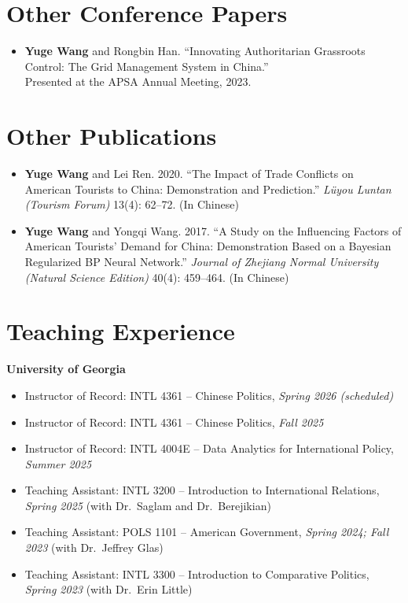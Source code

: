 \documentclass[11pt]{article}
\begin{document}
	\section*{Other Conference Papers}
	\begin{itemize}
		\item \textbf{Yuge Wang} and Rongbin Han. ``Innovating Authoritarian Grassroots Control: The Grid Management System in China.''\\
		Presented at the APSA Annual Meeting, 2023.
	\end{itemize}
	
	\section*{Other Publications}
	\begin{itemize}
		\item \textbf{Yuge Wang} and Lei Ren. 2020. ``The Impact of Trade Conflicts on American Tourists to China: Demonstration and Prediction.'' \emph{Lüyou Luntan (Tourism Forum)} 13(4): 62--72. (In Chinese)
		\item \textbf{Yuge Wang} and Yongqi Wang. 2017. ``A Study on the Influencing Factors of American Tourists' Demand for China: Demonstration Based on a Bayesian Regularized BP Neural Network.'' \emph{Journal of Zhejiang Normal University (Natural Science Edition)} 40(4): 459--464. (In Chinese)
	\end{itemize}
	
	\section*{Teaching Experience}
	\textbf{University of Georgia}
	\begin{itemize}
		\item Instructor of Record: INTL 4361 -- Chinese Politics, \emph{Spring 2026 (scheduled)}
		\item Instructor of Record: INTL 4361 -- Chinese Politics, \emph{Fall 2025}
		\item Instructor of Record: INTL 4004E -- Data Analytics for International Policy, \emph{Summer 2025}
		\item Teaching Assistant: INTL 3200 -- Introduction to International Relations, \emph{Spring 2025} (with Dr.\ Saglam and Dr.\ Berejikian)
		\item Teaching Assistant: POLS 1101 -- American Government, \emph{Spring 2024; Fall 2023} (with Dr.\ Jeffrey Glas)
		\item Teaching Assistant: INTL 3300 -- Introduction to Comparative Politics, \emph{Spring 2023} (with Dr.\ Erin Little)
	\end{itemize}
	
\end{document}

